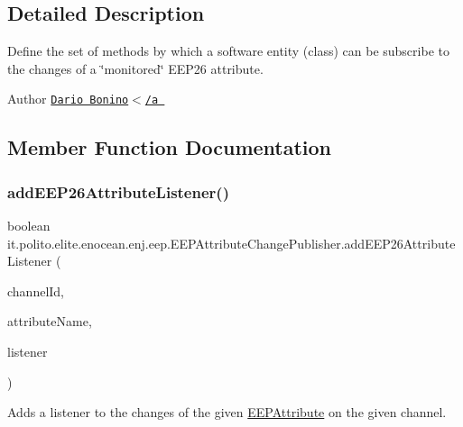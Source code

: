 \subsection{Detailed Description}
Define the set of methods by which a software entity (class) can be subscribe to the changes of a \char`\"{}monitored\char`\"{} E\+E\+P26 attribute.

\begin{DoxyAuthor}{Author}
\href{mailto:dario.bonino@gmail.com}{\tt Dario Bonino$<$/a }
\end{DoxyAuthor}


\subsection{Member Function Documentation}
\hypertarget{interfaceit_1_1polito_1_1elite_1_1enocean_1_1enj_1_1eep_1_1_e_e_p_attribute_change_publisher_a31b54249f260223e3ac6a86b99da482c}{}\label{interfaceit_1_1polito_1_1elite_1_1enocean_1_1enj_1_1eep_1_1_e_e_p_attribute_change_publisher_a31b54249f260223e3ac6a86b99da482c} 
\subsubsection{\texorpdfstring{add\+E\+E\+P26\+Attribute\+Listener()}{addEEP26AttributeListener()}}
{\footnotesize\ttfamily boolean it.\+polito.\+elite.\+enocean.\+enj.\+eep.\+E\+E\+P\+Attribute\+Change\+Publisher.\+add\+E\+E\+P26\+Attribute\+Listener (\begin{DoxyParamCaption}\item[{int}]{channel\+Id,  }\item[{String}]{attribute\+Name,  }\item[{\hyperlink{interfaceit_1_1polito_1_1elite_1_1enocean_1_1enj_1_1eep_1_1_e_e_p_attribute_change_listener}{E\+E\+P\+Attribute\+Change\+Listener}}]{listener }\end{DoxyParamCaption})}

Adds a listener to the changes of the given \hyperlink{classit_1_1polito_1_1elite_1_1enocean_1_1enj_1_1eep_1_1_e_e_p_attribute}{E\+E\+P\+Attribute} on the given channel.


